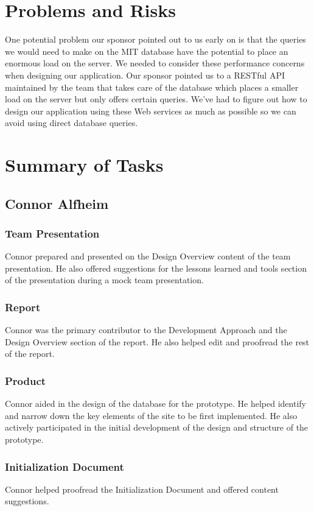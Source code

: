 \documentclass[12pt]{article}
\begin{document}
\begin{spacing}{1.5}
\section{Problems and Risks}
One potential problem our sponsor pointed out to us early on is that the queries we would need to make on the MIT database have the potential to place an enormous load on the server. We needed to consider these performance concerns when designing our application. Our sponsor pointed us to a RESTful API maintained by the team that takes care of the database which places a smaller load on the server but only offers certain queries. We've had to figure out how to design our application using these Web services as much as possible so we can avoid using direct database queries.
\clearpage
\section{Summary of Tasks}

\subsection{Connor Alfheim}
\subsubsection{Team Presentation}
Connor prepared  and presented on the Design Overview content of the team presentation. He also offered suggestions for the lessons learned and tools section of the presentation during a mock team presentation. 
\subsubsection{Report}
Connor was the primary contributor to the Development Approach and the Design Overview section of the report. He also helped edit and proofread the rest of the report.
\subsubsection{Product}
Connor aided in the design of the database for the prototype. He helped identify and narrow down the key elements of the site to be first implemented. He also actively participated in the initial development of the design and structure of the prototype.
\subsubsection{Initialization Document}
Connor helped proofread the Initialization Document and offered content suggestions. 

\end{spacing}
\end{document}
